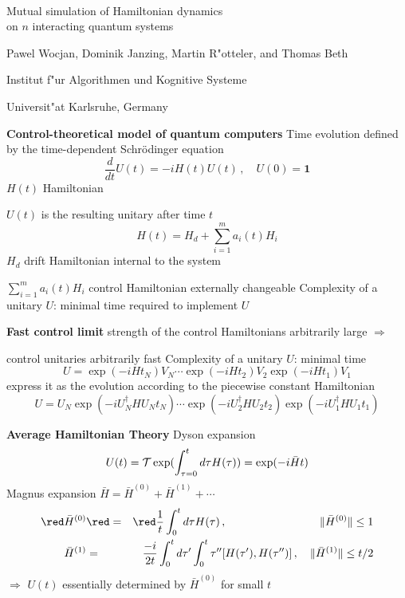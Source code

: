 \documentclass[portrait]{seminar}
\newcommand{\onemat}{{\mathbf 1}}
\begin{document}
\begin{slide}
{$ $}
\vfill
\begin{center}
{\Large \blue Mutual simulation of Hamiltonian dynamics\\ on $n$
interacting quantum systems} 

\vfill Pawel Wocjan, Dominik Janzing, Martin R"otteler, and Thomas Beth

{\small Institut f"ur Algorithmen und Kognitive Systeme}

{\small Universit"at Karlsruhe, Germany}
\end{center}
\vfill
\end{slide}

\begin{slide}
{\large {\bf Control-theoretical model of quantum computers}}
\vfill
{\blue Time evolution} defined by the {\blue
time-dependent Schr\"odinger equation}
\[
\frac{d}{dt} U(t) = -i H(t) U(t)\,,\quad U(0)=\onemat
\]
$H(t)$ Hamiltonian 

$U(t)$ is the resulting unitary after time $t$
\vfill
\[
H(t) = H_d + \sum_{i=1}^m a_i(t) H_i
\]
$H_d$ {\blue drift Hamiltonian} internal to the system

$\sum_{i=1}^m a_i(t) H_i$ {\blue control Hamiltonian} externally
changeable
\vfill
{\red Complexity of a unitary $U$}: minimal time required to implement
$U$
\vfill
\end{slide}

\begin{slide}
{\large {\bf Fast control limit}}
\vfill
strength of the control Hamiltonians arbitrarily large $\Longrightarrow$

{\blue control unitaries} arbitrarily fast
\vfill
{\red Complexity of a unitary $U$}: minimal time
\[
U=\exp(-i H t_N) V_N \cdots \exp(-i H t_2) V_2 \exp(-i H t_1) V_1
\]
\vfill
express it as the evolution according to the piecewise constant Hamiltonian
\[
U = U_N \exp(-i U_N^\dagger H U_N t_N) \cdots \exp(-i U_2^\dagger H U_2 t_2)
    \exp(-i U_1^\dagger H U_1 t_1)
\]
\vfill
\end{slide}


\begin{slide}
{\large {\bf Average Hamiltonian Theory}}
\vfill
{\blue Dyson expansion}
\[
U(t)={\cal T} \exp(\int_{\tau=0}^t d\tau H(\tau))=\exp(-i\bar{H}t)
\]
\vfill
{\blue Magnus expansion} $\bar{H}=\bar{H}^{(0)}+\bar{H}^{(1)}+\cdots$
\begin{eqnarray*}
{\red\bar{H}^{(0)}} & {\red =} & {\red \frac{1}{t}\int_0^t d\tau
H(\tau)\,,\quad\quad\quad\quad\ \quad\quad\quad\quad
\|\bar{H}^{(0)}\|\le 1} \\
\bar{H}^{(1)} & = & \frac{-i}{2t}\int_0^t
d\tau' \int_0^t\tau'' [H(\tau'),H(\tau'')]\,,\quad
\|\bar{H}^{(1)}\|\le t/2
\end{eqnarray*}
\vfill
{\red $\Longrightarrow$ $U(t)$ essentially determined by $\bar{H}^{(0)}$ for
small $t$}
\vfill
\end{slide}
\end{document}
